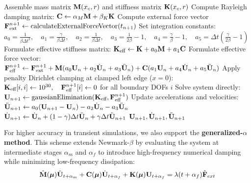 \begin{algorithm}[htbp]
\caption{Full Order Model (FOM) Implicit Dynamics Solver}
\label{alg:fom_dynamics}
\begin{algorithmic}[1]
    \State Assemble mass matrix $\mathbf{M}(x_c, r)$ and stiffness matrix $\mathbf{K}(x_c, r)$
    \State Compute Rayleigh damping matrix: $\mathbf{C} \gets \alpha_M \mathbf{M} + \beta_K \mathbf{K}$
    \State Compute external force vector $\mathbf{F}_{\text{ext}}^{n+1} \gets \text{calculateExternalForceVector}(t_{n+1})$
    \State Set integration constants:
    \State $a_0 = \frac{1}{\beta \Delta t^2}, \quad a_1 = \frac{\gamma}{\beta \Delta t}, \quad a_2 = \frac{1}{\beta \Delta t}, \quad a_3 = \frac{1}{2\beta} - 1, \quad a_4 = \frac{\gamma}{\beta} - 1, \quad a_5 = \Delta t \left( \frac{\gamma}{2\beta} - 1 \right)$
    \State Formulate effective stiffness matrix:
    \State $\mathbf{K}_{\text{eff}} \gets \mathbf{K} + a_0 \mathbf{M} + a_1 \mathbf{C}$
    \State Formulate effective force vector:
    \State $\mathbf{F}_{\text{eff}}^{n+1} \gets \mathbf{F}_{\text{ext}}^{n+1} + \mathbf{M}(a_0 \mathbf{U}_n + a_2 \dot{\mathbf{U}}_n + a_3 \ddot{\mathbf{U}}_n) + \mathbf{C}(a_1 \mathbf{U}_n + a_4 \dot{\mathbf{U}}_n + a_5 \ddot{\mathbf{U}}_n)$
    \State Apply penalty Dirichlet clamping at clamped left edge ($x=0$):
    \State $\mathbf{K}_{\text{eff}}[i, i] \gets 10^{30}, \quad \mathbf{F}_{\text{eff}}^{n+1}[i] \gets 0$ for all boundary DOFs $i$
    \State Solve system directly: $\mathbf{U}_{n+1} \gets \text{gaussianElimination}(\mathbf{K}_{\text{eff}}, \mathbf{F}_{\text{eff}}^{n+1})$
    \State Update accelerations and velocities:
    \State $\ddot{\mathbf{U}}_{n+1} \gets a_0 (\mathbf{U}_{n+1} - \mathbf{U}_n) - a_2 \dot{\mathbf{U}}_n - a_3 \ddot{\mathbf{U}}_n$
    \State $\dot{\mathbf{U}}_{n+1} \gets \dot{\mathbf{U}}_n + (1 - \gamma)\Delta t \ddot{\mathbf{U}}_n + \gamma \Delta t \ddot{\mathbf{U}}_{n+1}$
    \State \Return $\mathbf{U}_{n+1}, \dot{\mathbf{U}}_{n+1}, \ddot{\mathbf{U}}_{n+1}$
\EndProcedure
\end{algorithmic}
\end{algorithm}

For higher accuracy in transient simulations, we also support the \textbf{generalized-$\alpha$ method}. This scheme extends Newmark-$\beta$ by evaluating the system at intermediate stages $\alpha_m$ and $\alpha_f$ to introduce high-frequency numerical damping while minimizing low-frequency dissipation:
\begin{equation}
    \hat{\mathbf{M}}(\boldsymbol{\mu}) \ddot{\mathbf{U}}_{t+\alpha_m} + \mathbf{C}(\boldsymbol{\mu}) \dot{\mathbf{U}}_{t+\alpha_f} + \mathbf{K}(\boldsymbol{\mu}) \mathbf{U}_{t+\alpha_f} = \lambda(t+\alpha_f) \hat{\mathbf{F}}_{ext}
\end{equation}

